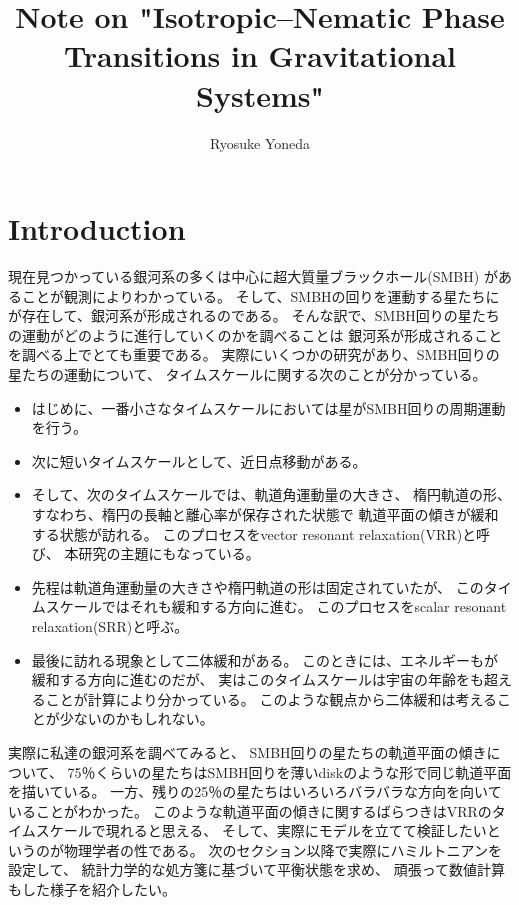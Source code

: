 \documentclass[10pt, pre, twocolumn, showpacs, aps]{revtex4-1}
\begin{document}
\title{Note on "Isotropic--Nematic Phase Transitions in Gravitational Systems"}
\author{Ryosuke Yoneda}
\maketitle

\section{Introduction}
現在見つかっている銀河系の多くは中心に超大質量ブラックホール(SMBH)
があることが観測によりわかっている。
そして、SMBHの回りを運動する星たちにが存在して、銀河系が形成されるのである。
そんな訳で、SMBH回りの星たちの運動がどのように進行していくのかを調べることは
銀河系が形成されることを調べる上でとても重要である。
実際にいくつかの研究があり、SMBH回りの星たちの運動について、
タイムスケールに関する次のことが分かっている。
\begin{itemize}
\item はじめに、一番小さなタイムスケールにおいては星がSMBH回りの周期運動を行う。
\item 次に短いタイムスケールとして、近日点移動がある。
\item そして、次のタイムスケールでは、軌道角運動量の大きさ、
楕円軌道の形、すなわち、楕円の長軸と離心率が保存された状態で
軌道平面の傾きが緩和する状態が訪れる。
このプロセスをvector resonant relaxation(VRR)と呼び、
本研究の主題にもなっている。
\item 先程は軌道角運動量の大きさや楕円軌道の形は固定されていたが、	
このタイムスケールではそれも緩和する方向に進む。
このプロセスをscalar resonant relaxation(SRR)と呼ぶ。
\item 最後に訪れる現象として二体緩和がある。
このときには、エネルギーもが緩和する方向に進むのだが、
実はこのタイムスケールは宇宙の年齢をも超えることが計算により分かっている。
このような観点から二体緩和は考えることが少ないのかもしれない。	
\end{itemize}
実際に私達の銀河系を調べてみると、
SMBH回りの星たちの軌道平面の傾きについて、
75％くらいの星たちはSMBH回りを薄いdiskのような形で同じ軌道平面を描いている。
一方、残りの25％の星たちはいろいろバラバラな方向を向いていることがわかった。
このような軌道平面の傾きに関するばらつきはVRRのタイムスケールで現れると思える、
そして、実際にモデルを立てて検証したいというのが物理学者の性である。
次のセクション以降で実際にハミルトニアンを設定して、
統計力学的な処方箋に基づいて平衡状態を求め、
頑張って数値計算もした様子を紹介したい。
\end{document}
